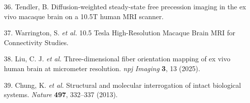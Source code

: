 \documentclass{article}
\begin{document}
\begin{hangpars}
36. Tendler, B. Diffusion-weighted steady-state free precession imaging in the ex vivo macaque brain on a 10.5T human MRI scanner.

37. Warrington, S. \emph{et al.} 10.5 Tesla High-Resolution Macaque Brain MRI for Connectivity Studies.

38. Liu, C. J. \emph{et al.} Three-dimensional fiber orientation mapping of ex vivo human brain at micrometer resolution. \emph{npj Imaging} \textbf{3}, 13 (2025).

39. Chung, K. \emph{et al.} Structural and molecular interrogation of intact biological systems. \emph{Nature} \textbf{497}, 332–337 (2013).

\end{hangpars}
\end{document}
